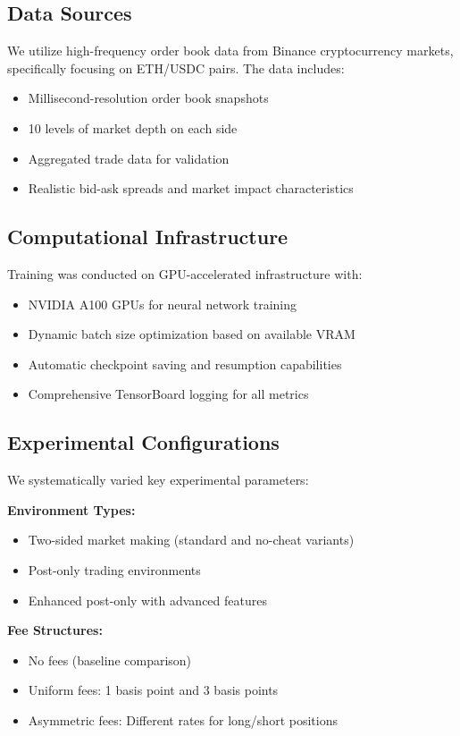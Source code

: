 \documentclass[conference]{IEEEtran}
\begin{document}
\subsection{Data Sources}

We utilize high-frequency order book data from Binance cryptocurrency markets, specifically focusing on ETH/USDC pairs. The data includes:
\begin{itemize}
\item Millisecond-resolution order book snapshots
\item 10 levels of market depth on each side
\item Aggregated trade data for validation
\item Realistic bid-ask spreads and market impact characteristics
\end{itemize}

\subsection{Computational Infrastructure}

Training was conducted on GPU-accelerated infrastructure with:
\begin{itemize}
\item NVIDIA A100 GPUs for neural network training
\item Dynamic batch size optimization based on available VRAM
\item Automatic checkpoint saving and resumption capabilities
\item Comprehensive TensorBoard logging for all metrics
\end{itemize}

\subsection{Experimental Configurations}

We systematically varied key experimental parameters:

\textbf{Environment Types:}
\begin{itemize}
\item Two-sided market making (standard and no-cheat variants)
\item Post-only trading environments
\item Enhanced post-only with advanced features
\end{itemize}

\textbf{Fee Structures:}
\begin{itemize}
\item No fees (baseline comparison)
\item Uniform fees: 1 basis point and 3 basis points
\item Asymmetric fees: Different rates for long/short positions
\end{itemize}
\end{document}
